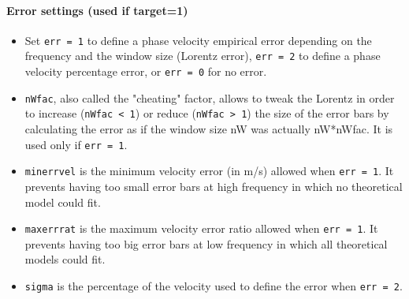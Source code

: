 \documentclass[twoside,a4paper]{article}
\begin{document}
\paragraph{Error settings (used if target=1)}
\begin{itemize}
\setlength\itemsep{2ex}
\setlength{\parindent}{5ex}

\item Set \verb|err = 1| to define a phase velocity empirical error depending on the frequency and the window size (Lorentz error), \verb|err = 2| to define a phase velocity percentage error, or \verb|err = 0| for no error.

\item \verb|nWfac|, also called the "cheating" factor, allows to tweak the Lorentz in order to increase (\verb|nWfac < 1|) or reduce (\verb|nWfac > 1|) the size of the error bars by calculating the error as if the window size nW was actually nW*nWfac. It is used only if \verb|err = 1|.

\item \verb|minerrvel| is the minimum velocity error (in m/s) allowed when \verb|err = 1|. It prevents having too small error bars at high frequency in which no theoretical model could fit.

\item \verb|maxerrrat| is the maximum velocity error ratio allowed when \verb|err = 1|. It prevents having too big error bars at low frequency in which all theoretical models could fit.

\item \verb|sigma| is the percentage of the velocity used to define the error when \verb|err = 2|.

\end{itemize}
\end{document}
